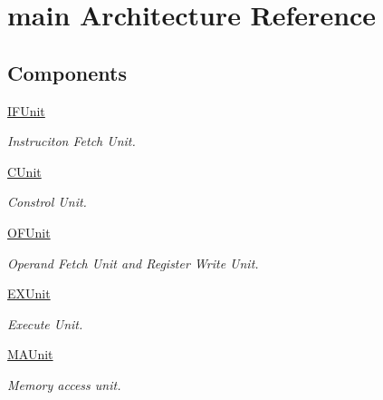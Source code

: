 \hypertarget{class_simple_r_i_s_c_1_1main}{\section{main Architecture Reference}
\label{class_simple_r_i_s_c_1_1main}
}
\subsection*{Components}
 \begin{DoxyCompactItemize}
\item 
\hypertarget{class_simple_r_i_s_c_1_1main_a2da5b49da774fb039de79c08078b9c4c}{\hyperlink{class_simple_r_i_s_c_1_1main_a2da5b49da774fb039de79c08078b9c4c}{I\-F\-Unit}  {\bfseries }  }\label{class_simple_r_i_s_c_1_1main_a2da5b49da774fb039de79c08078b9c4c}

\begin{DoxyCompactList}\small\item\em Instruciton Fetch Unit. \end{DoxyCompactList}\item 
\hypertarget{class_simple_r_i_s_c_1_1main_a776fe425523eab02e315d8a4d28e30b7}{\hyperlink{class_simple_r_i_s_c_1_1main_a776fe425523eab02e315d8a4d28e30b7}{C\-Unit}  {\bfseries }  }\label{class_simple_r_i_s_c_1_1main_a776fe425523eab02e315d8a4d28e30b7}

\begin{DoxyCompactList}\small\item\em Constrol Unit. \end{DoxyCompactList}\item 
\hypertarget{class_simple_r_i_s_c_1_1main_ad558d5ce62b24bcc71c1098c3b5252f8}{\hyperlink{class_simple_r_i_s_c_1_1main_ad558d5ce62b24bcc71c1098c3b5252f8}{O\-F\-Unit}  {\bfseries }  }\label{class_simple_r_i_s_c_1_1main_ad558d5ce62b24bcc71c1098c3b5252f8}

\begin{DoxyCompactList}\small\item\em Operand Fetch Unit and Register Write Unit. \end{DoxyCompactList}\item 
\hypertarget{class_simple_r_i_s_c_1_1main_aeeb36d4e2f94902e0f51d5f1e619c3f7}{\hyperlink{class_simple_r_i_s_c_1_1main_aeeb36d4e2f94902e0f51d5f1e619c3f7}{E\-X\-Unit}  {\bfseries }  }\label{class_simple_r_i_s_c_1_1main_aeeb36d4e2f94902e0f51d5f1e619c3f7}

\begin{DoxyCompactList}\small\item\em Execute Unit. \end{DoxyCompactList}\item 
\hypertarget{class_simple_r_i_s_c_1_1main_aad9e7d27bfbe753d62128f7d34d08b15}{\hyperlink{class_simple_r_i_s_c_1_1main_aad9e7d27bfbe753d62128f7d34d08b15}{M\-A\-Unit}  {\bfseries }  }\label{class_simple_r_i_s_c_1_1main_aad9e7d27bfbe753d62128f7d34d08b15}

\begin{DoxyCompactList}\small\item\em Memory access unit. \end{DoxyCompactList}\end{DoxyCompactItemize}
